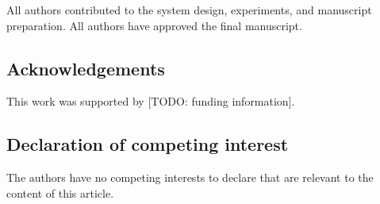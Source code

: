 \documentclass{CVM}
\begin{document}
All authors contributed to the system design, experiments, and manuscript
preparation. All authors have approved the final manuscript.

\subsection*{Acknowledgements}

This work was supported by [TODO: funding information].

\subsection*{Declaration of competing interest}

The authors have no competing interests to declare that are relevant to the
content of this article.
\end{document}
